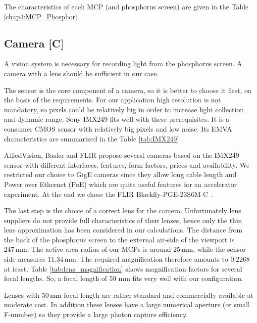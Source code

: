 \begin{refsection}
  The characteristics of each MCP (and phosphorus screen) are given in the Table \ref{chap4:MCP_Phosphor}.
  

  \subsection{Camera [C]}
  A vision system is necessary for recording light from the phosphorus screen.
  A camera with a lens should be sufficient in our case.

  The sensor is the core component of a camera, so it is better to choose it first, on the basis of the requirements.
  For our application high resolution is not mandatory, so pixels could be relatively big in order to increase light collection and dynamic range.
  Sony IMX249 fits well with these prerequisites. It is a consumer CMOS sensor with relatively big pixels and low noise.
  Its EMVA characteristics are summarized in the Table \ref{tab:IMX249} \cite{emva2010}.
  

  AlliedVision, Basler and FLIR propose several cameras based on the IMX249 sensor with different interfaces, features, form factors, prices and availability.
  We restricted our choice to GigE cameras since they allow long cable length and Power over Ethernet (PoE) which are quite useful features for an accelerator experiment.
  At the end we chose the FLIR Blackfly-PGE-23S6M-C \cite{blackfly2019}.

  The last step is the choice of a correct lens for the camera.
  Unfortunately lens suppliers do not provide full characteristics of their lenses, hence only the thin lens approximation has been considered in our calculations. The distance from the back of the phosphorus screen to the external air-side of the viewport is $247\,\mathrm{mm}$. The active area radius of our MCPs is around $25\,\mathrm{mm}$, while the sensor side measures $11.34\,\mathrm{mm}$. The required magnification therefore amounts to $0.2268$ at least.
  Table \ref{tab:lens_magnification} shows magnification factors for several focal lengths. So, a focal length of 50 mm fits very well with our configuration.
  

  Lenses with $50\,\mathrm{mm}$ focal length are rather standard and commercially available at moderate cost. In addition these lenses have a large numerical aperture (or small F-number) so they provide a large photon capture efficiency.


\end{refsection}
